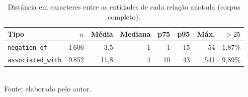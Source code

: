 \begin{table}[htbp]
  \centering
  \caption{Distância em caracteres entre as entidades de cada relação anotada (corpus completo).}
  \label{tab:distancia}
  \begin{tabular}{lrrrrrrr}
  \toprule
  Tipo & $n$ & Média & Mediana & p75 & p95 & Máx. & $>25$ \\
  \midrule
\texttt{negation\_of} & 1\,606 & 3{,}5 & 1 & 1 & 15 & 54 & 1{,}87\% \\
\texttt{associated\_with} & 9\,852 & 11{,}8 & 4 & 10 & 43 & 541 & 9{,}89\% \\
  \bottomrule
  \end{tabular}\\[4pt]
  {\footnotesize Fonte: elaborado pelo autor.}
\end{table}
